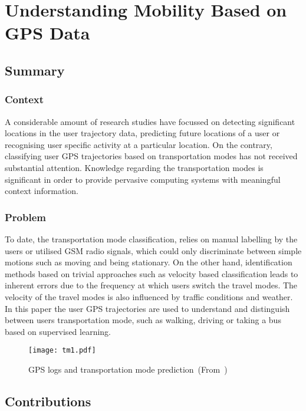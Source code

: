 \newpage
\section{Understanding Mobility Based on GPS Data~\cite{Zheng:2008:UMB:1409635.1409677}} \label{lect2}

\subsection*{Summary}

\subsubsection*{Context}

A considerable amount of research studies have focussed on detecting significant locations
in the user trajectory data, predicting future locations of a user or recognising user specific
activity at a particular location. On the contrary, classifying user GPS trajectories
based on transportation modes has not received substantial attention. Knowledge regarding
the transportation modes is significant in order to provide pervasive computing systems with
meaningful context information.

\subsubsection*{Problem}

To date, the transportation mode classification, relies on manual labelling by the users or
utilised GSM radio signals, which could only discriminate between simple motions such as moving
and being stationary. On the other hand, identification methods based on trivial approaches such
as velocity based classification leads to inherent errors due to the frequency at which users
switch the travel modes. The velocity of the travel modes is also influenced by traffic conditions
and weather. In this paper the user GPS trajectories are used to understand and
distinguish between users transportation mode, such as walking, driving or taking a bus based on
supervised learning.

\begin{figure}[h]
\centering
\texttt{[image: tm1.pdf]}
\caption{GPS logs and transportation mode prediction~(From~\cite{Zheng:2008:UMB:1409635.1409677})}
\end{figure}

\subsection*{Contributions}

